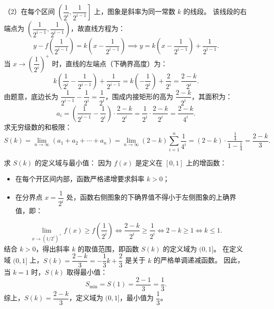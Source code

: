\begin{answer}
（2）在每个区间 $\left(\dfrac{1}{2^i}, \dfrac{1}{2^{i-1}}\right]$ 上，图象是斜率为同一常数 $k$ 的线段。
该线段的右端点为 $\left(\dfrac{1}{2^{i-1}}, \dfrac{1}{2^{i-1}}\right)$，故直线方程为：
\nopagebreak[4]
\[
y-f\left(\frac{1}{2^{i-1}}\right)=k\left(x-\frac{1}{2^{i-1}}\right)\implies y=k\left(x-\frac{1}{2^{i-1}}\right)+\frac{1}{2^{i-1}}.
\]
当 $x\to \left(\dfrac{1}{2^i}\right)^+$ 时，直线的左端点（下确界高度）为：
\nopagebreak[4]
\[
k\left(\frac{1}{2^i}-\frac{1}{2^{i-1}}\right)+\frac{1}{2^{i-1}}=k\left(-\frac{1}{2^i}\right)+\frac{2}{2^i}=\frac{2-k}{2^i}.
\]
由题意，底边长为 $\dfrac{1}{2^{i-1}}-\dfrac{1}{2^i}=\dfrac{1}{2^i}$，围成内接矩形的高为 $\dfrac{2-k}{2^i}$，其面积为：
\nopagebreak[4]
\[
a_i=\left(\frac{1}{2^{i-1}}-\frac{1}{2^i}\right)\cdot \frac{2-k}{2^i}=\frac{1}{2^i}\cdot\frac{2-k}{2^i}=\frac{2-k}{4^i}.
\]
求无穷级数的和极限：
\nopagebreak[4]
\[
S(k)=\lim_{n\to\infty}(a_1+a_2+\cdots+a_n)=\lim_{n\to\infty}(2-k)\sum_{i=1}^n \frac{1}{4^i}=(2-k)\cdot\frac{\frac{1}{4}}{1-\frac{1}{4}}=\frac{2-k}{3}.
\]

求 $S(k)$ 的定义域与最小值：
因为 $f(x)$ 是定义在 $[0, 1]$ 上的增函数：
\begin{itemize}
\item 在每个开区间内部，函数严格递增要求斜率 $k>0$；
\item 在分界点 $x=\dfrac{1}{2^i}$ 处，函数右侧图象的下确界值不得小于左侧图象的上确界值，即：
\end{itemize}
\nopagebreak[4]
\[
\lim_{x\to(1/2^i)^+} f(x)\ge f\left(\frac{1}{2^i}\right)\iff \frac{2-k}{2^i}\ge \frac{1}{2^i}\iff 2-k\ge 1\iff k\le 1.
\]
结合 $k>0$，得出斜率 $k$ 的取值范围，即函数 $S(k)$ 的定义域为 $(0, 1]$。
在定义域 $(0, 1]$ 上，$S(k)=\dfrac{2-k}{3}=-\dfrac{1}{3}k+\dfrac{2}{3}$ 是关于 $k$ 的严格单调递减函数。
因此，当 $k=1$ 时，$S(k)$ 取得最小值：
\nopagebreak[4]
\[
S_{\min}=S(1)=\frac{2-1}{3}=\frac{1}{3}.
\]
综上，$S(k)=\dfrac{2-k}{3}$，定义域为 $(0, 1]$，最小值为 $\dfrac{1}{3}$。

\gkanswer{答案：（1）$f(0)=0$，$f\left(\dfrac{1}{2}\right)=\dfrac{1}{2}$，$f\left(\dfrac{1}{4}\right)=\dfrac{1}{4}$，$f\left(\dfrac{1}{2^i}\right)=\dfrac{1}{2^i}$（$i=1, 2, \cdots$）；（2）$S(k)=\dfrac{2-k}{3}$，定义域为 $(0, 1]$，最小值为 $\dfrac{1}{3}$}

\end{answer}
